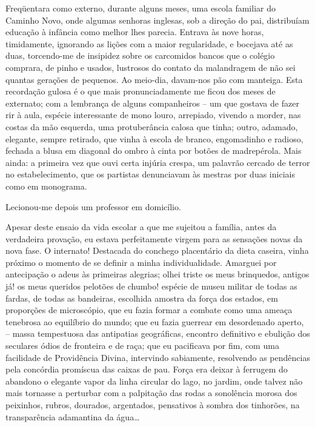 Freqüentara como externo, durante alguns
meses, uma escola familiar do Caminho Novo, onde algumas senhoras
inglesas, sob a direção do pai, distribuíam educação à infância como
melhor lhes parecia. Entrava às nove horas, timidamente, ignorando as
lições com a maior regularidade, e bocejava até as duas, torcendo{}-me
de insipidez sobre os carcomidos bancos que o colégio comprara, de
pinho e usados, lustrosos do contato da malandragem de não sei quantas
gerações de pequenos. Ao meio{}-dia, davam{}-nos pão com manteiga. Esta
recordação gulosa é o que mais pronunciadamente me ficou dos meses de
externato; com a lembrança de alguns companheiros -- um que gostava de
fazer rir à aula, espécie interessante de mono louro, arrepiado,
vivendo a morder, nas costas da mão esquerda, uma protuberância calosa
que tinha; outro, adamado, elegante, sempre retirado, que vinha à
escola de branco, engomadinho e radioso, fechada a blusa em diagonal do
ombro à cinta por botões de madrepérola. Mais ainda: a primeira vez que
ouvi certa injúria crespa, um palavrão cercado de terror no
estabelecimento, que os partistas denunciavam às mestras por duas
iniciais como em monograma. 

Lecionou{}-me depois um professor em domicílio. 

Apesar deste ensaio da vida escolar a que me sujeitou a
família, antes da verdadeira provação, eu estava perfeitamente virgem
para as sensações novas da nova fase. O internato! Destacada do
conchego placentário da dieta caseira, vinha próximo o momento de se
definir a minha individualidade. Amarguei por antecipação o adeus às primeiras alegrias;
olhei triste os meus brinquedos, antigos já! os meus queridos pelotões
de chumbo! espécie de museu militar de todas as fardas, de todas as
bandeiras, escolhida amostra da força dos estados, em proporções de
microscópio, que eu fazia formar a combate como uma ameaça tenebrosa ao
equilíbrio do mundo; que eu fazia guerrear em desordenado aperto, -- 
massa tempestuosa das antipatias geográficas, encontro definitivo e
ebulição dos seculares ódios de fronteira e de raça; que eu pacificava
por fim, com uma facilidade de Providência Divina, intervindo
sabiamente, resolvendo as pendências pela concórdia promíscua das
caixas de pau. Força era deixar à ferrugem do abandono o elegante vapor
da linha circular do lago, no jardim, onde talvez não mais tornasse a
perturbar com a palpitação das rodas a sonolência morosa dos peixinhos,
rubros, dourados, argentados, pensativos à sombra dos tinhorões, na
transparência adamantina da água\ldots 

